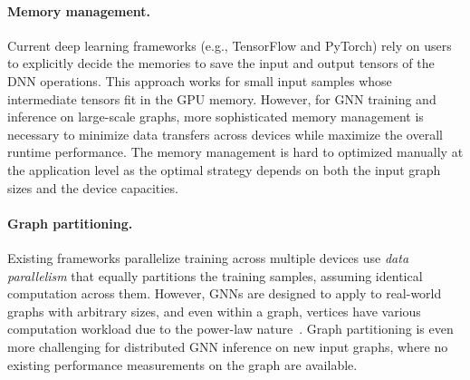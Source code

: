 \paragraph{Memory management.}
Current deep learning frameworks (e.g., TensorFlow and PyTorch) rely on users to explicitly decide the memories to save the input and output tensors of the DNN operations.
This approach works for small input samples whose intermediate tensors fit in the GPU memory.
However, for GNN training and inference on large-scale graphs, more sophisticated memory management is necessary to minimize data transfers across devices while maximize the overall runtime performance.
The memory management is hard to optimized manually at the application level as the optimal strategy depends on both the input graph sizes and the device capacities.

%

\paragraph{Graph partitioning.}
Existing frameworks parallelize training across multiple devices use {\em data parallelism} that equally partitions the training samples, assuming identical computation across them. 
However, GNNs are designed to apply to real-world graphs with arbitrary sizes, and even within a graph, vertices have various computation workload due to the power-law nature~\cite{PowerGraph}.
Graph partitioning is even more challenging for distributed GNN inference on new input graphs, where no existing performance measurements on the graph are available.

